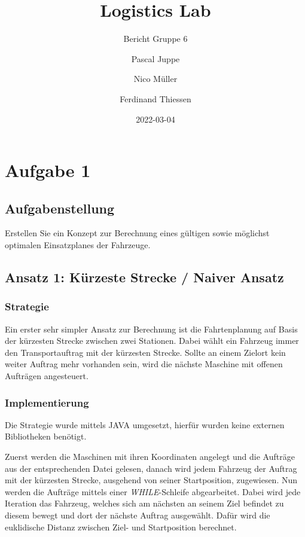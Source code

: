 \documentclass[ngerman]{tudscrreprt}
\begin{document}
\date{2022-03-04}
\author{%
Pascal Juppe%
%
\and%
Nico Müller%
%
\and%
Ferdinand Thiessen%
%
}
\title{Logistics Lab}
\subtitle{Bericht Gruppe 6}
\maketitle


\setcounter{tocdepth}{1}
\tableofcontents

\chapter{Aufgabe 1}
\section{Aufgabenstellung}
Erstellen Sie ein Konzept zur Berechnung eines gültigen sowie möglichst optimalen
Einsatzplanes der Fahrzeuge.

\section{Ansatz 1: Kürzeste Strecke / Naiver Ansatz}
\subsection{Strategie}
Ein erster sehr simpler Ansatz zur Berechnung ist die Fahrtenplanung auf Basis
der kürzesten Strecke zwischen zwei Stationen.
Dabei wählt ein Fahrzeug immer den Transportauftrag mit der kürzesten Strecke.
Sollte an einem Zielort kein weiter Auftrag mehr vorhanden sein, wird die nächste
Maschine mit offenen Aufträgen angesteuert.

\subsection{Implementierung}
Die Strategie wurde mittels JAVA umgesetzt, hierfür wurden keine externen
Bibliotheken benötigt.

Zuerst werden die Maschinen mit ihren Koordinaten angelegt und die Aufträge aus
der entsprechenden Datei gelesen, danach wird jedem Fahrzeug der Auftrag mit der
kürzesten Strecke, ausgehend von seiner Startposition, zugewiesen.
Nun werden die Aufträge mittels einer \emph{WHILE}-Schleife abgearbeitet.
Dabei wird jede Iteration das Fahrzeug, welches sich am nächsten an seinem Ziel befindet
zu diesem bewegt und dort der nächste Auftrag ausgewählt. Dafür wird die euklidische
Distanz zwischen Ziel- und Startposition berechnet.
\end{document}
